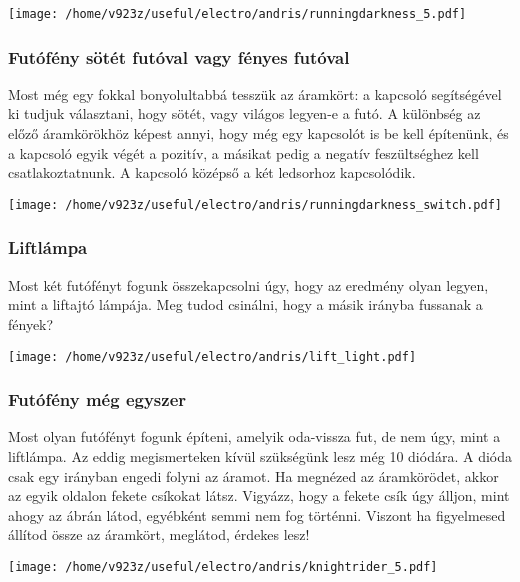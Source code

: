 \documentclass[16pt]{scrreprt}
\begin{document}
\texttt{[image: /home/v923z/useful/electro/andris/runningdarkness\_5.pdf]}

\subsubsection{Futófény sötét futóval vagy fényes futóval}
Most még egy fokkal bonyolultabbá tesszük az áramkört: a kapcsoló segítségével ki tudjuk választani, hogy sötét, vagy
világos legyen-e a futó. A különbség az előző áramkörökhöz képest annyi, hogy még egy kapcsolót is be kell építenünk,
és a kapcsoló egyik végét a pozitív, a másikat pedig a negatív feszültséghez kell csatlakoztatnunk. A kapcsoló középső
a két ledsorhoz kapcsolódik. 

\texttt{[image: /home/v923z/useful/electro/andris/runningdarkness\_switch.pdf]}

\subsubsection{Liftlámpa}
Most két futófényt fogunk összekapcsolni úgy, hogy az eredmény olyan legyen, mint a liftajtó lámpája. Meg tudod
csinálni, hogy a másik irányba fussanak a fények?

\texttt{[image: /home/v923z/useful/electro/andris/lift\_light.pdf]}

\subsubsection{Futófény még egyszer}
Most olyan futófényt fogunk építeni, amelyik oda-vissza fut, de nem úgy, mint a liftlámpa. Az eddig megismerteken kívül
szükségünk lesz még 10 diódára. A dióda csak egy irányban engedi folyni az áramot. Ha megnézed az áramkörödet, akkor az
egyik oldalon fekete csíkokat látsz. Vigyázz, hogy a fekete csík úgy álljon, mint ahogy az ábrán látod, egyébként semmi
nem fog történni. Viszont ha figyelmesed állítod össze az áramkört, meglátod, érdekes lesz!

\texttt{[image: /home/v923z/useful/electro/andris/knightrider\_5.pdf]}
\end{document}

